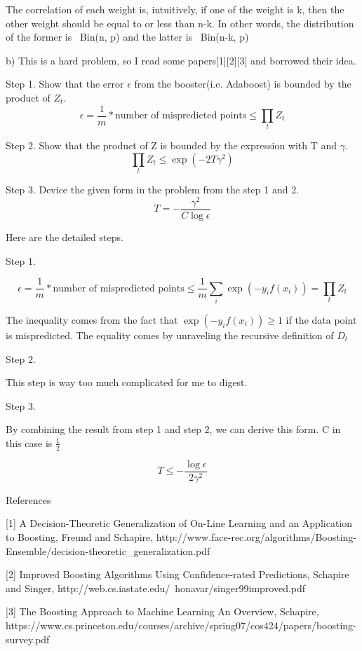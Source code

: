 \documentclass[11pt]{article}
\theoremstyle{definition}
\begin{document}
The correlation of each weight is, intuitively, if one of the weight is k, then the other weight should be equal to or less than n-k. In other words, the distribution of the former is ~Bin(n, p) and the latter is ~Bin(n-k, p)

\bigskip
b)
This is a hard problem, so I read some papers[1][2][3] and borrowed their idea.

Step 1. Show that the error $\epsilon$ from the booster(i.e. Adaboost) is bounded by the product of $Z_t$.
\begin{equation*}
\epsilon = \frac{1}{m} * {\text{number of mispredicted points}} \le \prod_{t} Z_t
\end{equation*}

Step 2. Show that the product of Z is bounded by the expression with T and $\gamma$.
\begin{equation*}
\prod_{t} Z_t \le \exp(-2T\gamma^2)
\end{equation*}

Step 3. Device the given form in the problem from the step 1 and 2.
\begin{equation*}
T = - \frac{\gamma^2}{C\log \epsilon}
\end{equation*}

\bigskip
Here are the detailed steps.

Step 1.

\begin{equation*}
\epsilon = \frac{1}{m} * {\text{number of mispredicted points}} \le 
\frac{1}{m} \sum_{i} \exp(-y_if(x_i)) =
\prod_{t} Z_t
\end{equation*}

The inequality comes from the fact that $\exp(-y_if(x_i)) \ge 1$ if the data point is mispredicted. The equality comes by unraveling the recursive definition of $D_t$

Step 2.

This step is way too much complicated for me to digest.

Step 3.

By combining the result from step 1 and step 2, we can derive this form.
C in this case is $\frac{1}{2}$

\begin{equation*}
T \le - \frac {\log \epsilon}{2\gamma^2}
\end{equation*}

\bigskip
References

[1] A Decision-Theoretic Generalization of On-Line Learning and an Application to Boosting, Freund and Schapire, 
http://www.face-rec.org/algorithms/Boosting-Ensemble/decision-theoretic_generalization.pdf

[2] Improved Boosting Algorithms
Using Confidence-rated Predictions, Schapire and Singer, http://web.cs.iastate.edu/~honavar/singer99improved.pdf

[3] The Boosting Approach to Machine Learning An Overview, Schapire, https://www.cs.princeton.edu/courses/archive/spring07/cos424/papers/boosting-survey.pdf
\end{document}
